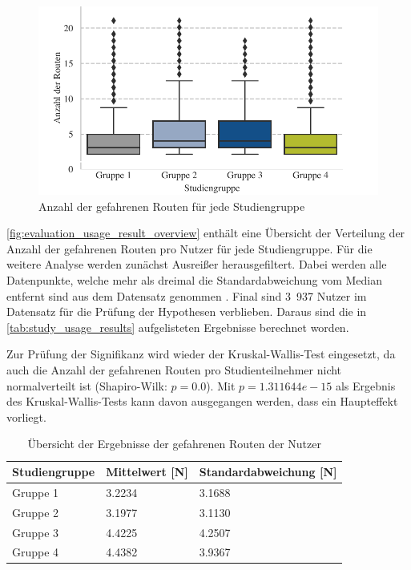 \begin{figure}[b!]
    \centering
    \includegraphics[width=\textwidth]{contents/06_model_evaluation/02_evaluation/res/usage_result_overview.pdf}
    \caption{Anzahl der gefahrenen Routen für jede Studiengruppe}
    \label{fig:evaluation_usage_result_overview}
\end{figure}

\autoref{fig:evaluation_usage_result_overview} enthält eine Übersicht der Verteilung der Anzahl der gefahrenen Routen pro Nutzer für jede Studiengruppe. Für die weitere Analyse werden zunächst Ausreißer herausgefiltert. Dabei werden alle Datenpunkte, welche mehr als dreimal die Standardabweichung vom Median entfernt sind aus dem Datensatz genommen \cite{leyes2013detecting}. Final sind 3~937 Nutzer im Datensatz für die Prüfung der Hypothesen verblieben. Daraus sind die in \autoref{tab:study_usage_results} aufgelisteten Ergebnisse berechnet worden.

Zur Prüfung der Signifikanz wird wieder der Kruskal-Wallis-Test eingesetzt, da auch die Anzahl der gefahrenen Routen pro Studienteilnehmer nicht normalverteilt ist (Shapiro-Wilk: $ p = 0.0 $). Mit $ p = 1.311644e-15 $ als Ergebnis des Kruskal-Wallis-Tests kann davon ausgegangen werden, dass ein Haupteffekt vorliegt.

\begin{table}[htb!]
    \centering
    \begin{tabular}{p{}p{}p{}}
        \hline
        Studiengruppe  & Mittelwert [N] & Standardabweichung [N] \\
        \toprule
        Gruppe 1                & 3.2234 & 3.1688 \\
        Gruppe 2                & 3.1977 & 3.1130 \\
        Gruppe 3                & 4.4225 & 4.2507 \\
        Gruppe 4                & 4.4382 & 3.9367 \\
        \bottomrule
    \end{tabular}
    \caption{Übersicht der Ergebnisse der gefahrenen Routen der Nutzer}
    \label{tab:study_usage_results}
\end{table}

